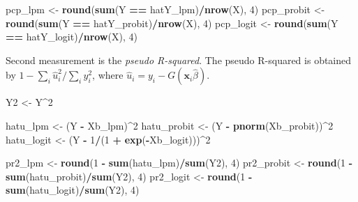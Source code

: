 \documentclass[
  12pt,
]{article}
\newenvironment{Shaded}{\begin{snugshade}}{\end{snugshade}}
\newcommand{\DecValTok}[1]{\textcolor[rgb]{0.00,0.00,0.81}{#1}}
\newcommand{\KeywordTok}[1]{\textcolor[rgb]{0.13,0.29,0.53}{\textbf{#1}}}
\newcommand{\NormalTok}[1]{#1}
\newcommand{\OperatorTok}[1]{\textcolor[rgb]{0.81,0.36,0.00}{\textbf{#1}}}
\newcommand{\StringTok}[1]{\textcolor[rgb]{0.31,0.60,0.02}{#1}}
\begin{document}
\begin{Shaded}
\begin{Highlighting}[]
\NormalTok{pcp\_lpm \textless{}{-}}\StringTok{ }\KeywordTok{round}\NormalTok{(}\KeywordTok{sum}\NormalTok{(Y }\OperatorTok{==}\StringTok{ }\NormalTok{hatY\_lpm)}\OperatorTok{/}\KeywordTok{nrow}\NormalTok{(X), }\DecValTok{4}\NormalTok{)}
\NormalTok{pcp\_probit \textless{}{-}}\StringTok{ }\KeywordTok{round}\NormalTok{(}\KeywordTok{sum}\NormalTok{(Y }\OperatorTok{==}\StringTok{ }\NormalTok{hatY\_probit)}\OperatorTok{/}\KeywordTok{nrow}\NormalTok{(X), }\DecValTok{4}\NormalTok{)}
\NormalTok{pcp\_logit \textless{}{-}}\StringTok{ }\KeywordTok{round}\NormalTok{(}\KeywordTok{sum}\NormalTok{(Y }\OperatorTok{==}\StringTok{ }\NormalTok{hatY\_logit)}\OperatorTok{/}\KeywordTok{nrow}\NormalTok{(X), }\DecValTok{4}\NormalTok{)}
\end{Highlighting}
\end{Shaded}

Second measurement is the \emph{pseudo R-squared}. The pseudo R-squared
is obtained by \(1 - \sum_i \hat{u}_i^2/ \sum_i y_i^2\), where
\(\hat{u}_i = y_i - G(\mathbf{x}_i \hat{\beta})\).

\begin{Shaded}
\begin{Highlighting}[]
\NormalTok{Y2 \textless{}{-}}\StringTok{ }\NormalTok{Y}\OperatorTok{\^{}}\DecValTok{2}

\NormalTok{hatu\_lpm \textless{}{-}}\StringTok{ }\NormalTok{(Y }\OperatorTok{{-}}\StringTok{ }\NormalTok{Xb\_lpm)}\OperatorTok{\^{}}\DecValTok{2}
\NormalTok{hatu\_probit \textless{}{-}}\StringTok{ }\NormalTok{(Y }\OperatorTok{{-}}\StringTok{ }\KeywordTok{pnorm}\NormalTok{(Xb\_probit))}\OperatorTok{\^{}}\DecValTok{2}
\NormalTok{hatu\_logit \textless{}{-}}\StringTok{ }\NormalTok{(Y }\OperatorTok{{-}}\StringTok{ }\DecValTok{1}\OperatorTok{/}\NormalTok{(}\DecValTok{1} \OperatorTok{+}\StringTok{ }\KeywordTok{exp}\NormalTok{(}\OperatorTok{{-}}\NormalTok{Xb\_logit)))}\OperatorTok{\^{}}\DecValTok{2}

\NormalTok{pr2\_lpm \textless{}{-}}\StringTok{ }\KeywordTok{round}\NormalTok{(}\DecValTok{1} \OperatorTok{{-}}\StringTok{ }\KeywordTok{sum}\NormalTok{(hatu\_lpm)}\OperatorTok{/}\KeywordTok{sum}\NormalTok{(Y2), }\DecValTok{4}\NormalTok{)}
\NormalTok{pr2\_probit \textless{}{-}}\StringTok{ }\KeywordTok{round}\NormalTok{(}\DecValTok{1} \OperatorTok{{-}}\StringTok{ }\KeywordTok{sum}\NormalTok{(hatu\_probit)}\OperatorTok{/}\KeywordTok{sum}\NormalTok{(Y2), }\DecValTok{4}\NormalTok{)}
\NormalTok{pr2\_logit \textless{}{-}}\StringTok{ }\KeywordTok{round}\NormalTok{(}\DecValTok{1} \OperatorTok{{-}}\StringTok{ }\KeywordTok{sum}\NormalTok{(hatu\_logit)}\OperatorTok{/}\KeywordTok{sum}\NormalTok{(Y2), }\DecValTok{4}\NormalTok{)}
\end{Highlighting}
\end{Shaded}
\end{document}

